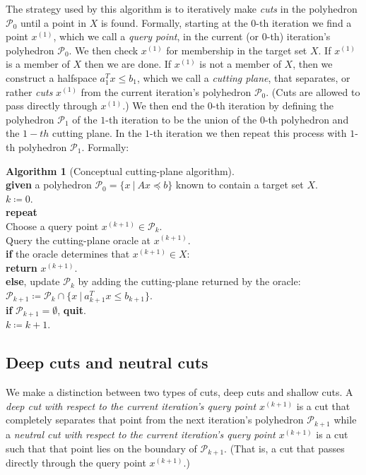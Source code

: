 \documentclass[11pt]{amsart}
\theoremstyle{definition}
\newtheorem{algorithm}{Algorithm}
\theoremstyle{remark}
\newcommand{\ind}{\hspace*{0.5cm}}
\newcommand{\transpose}{T}
\begin{document}
        The strategy used by this algorithm is to iteratively make \emph{cuts} in the polyhedron $\mathcal{P}_0$ until a point in $X$ is found. Formally, starting at the $0$-th iteration we find a point $x^{(1)}$, which we call a \emph{query point}, in the current (or $0$-th) iteration's polyhedron $\mathcal{P}_0$. We then check $x^{(1)}$ for membership in the target set $X$. If $x^{(1)}$ is a member of $X$ then we are done. If $x^{(1)}$ is not a member of $X$, then we construct a halfspace $a_{1}^\transpose x \leq b_{1}$, which we call a \emph{cutting plane}, that separates, or rather \emph{cuts} $x^{(1)}$ from the current iteration's polyhedron $\mathcal{P}_0$. (Cuts are allowed to pass directly through $x^{(1)}$.) We then end the $0$-th iteration by defining the polyhedron $\mathcal{P}_1$ of the $1$-th iteration to be the union of the $0$-th polyhedron and the $1-th$ cutting plane. In the $1$-th iteration we then repeat this process with $1$-th polyhedron $\mathcal{P}_1$. Formally:
        \begin{algorithm}[Conceptual cutting-plane algorithm]
        \label{a:general_cp_alg}\mbox{}\\
            \ind \textbf{given} a polyhedron $\mathcal{P}_0 = \{x \:|\: Ax \preceq b\}$ known to contain a target set $X$. \\
            \ind $k \coloneqq 0$. \\
            \ind \textbf{repeat} \\
            \ind\ind Choose a query point $x^{(k+1)} \in \mathcal{P}_k$. \\
            \ind\ind Query the cutting-plane oracle at $x^{(k+1)}$. \\
            \ind\ind \textbf{if} the oracle determines that $x^{(k+1)} \in X$: \\
            \ind\ind\ind\textbf{return} $x^{(k+1)}$. \\
            \ind\ind \textbf{else}, update $\mathcal{P}_k$ by adding the cutting-plane returned by the oracle: \\ 
            \ind\ind\ind $\mathcal{P}_{k+1} \coloneqq \mathcal{P}_k \cap \{x \:|\: a_{k+1}^\transpose x \leq b_{k+1} \}$. \\
            \ind\ind \textbf{if} $\mathcal{P}_{k+1} = \emptyset$, \textbf{quit}. \\
            \ind\ind $k \coloneqq k+1$.
        \end{algorithm}

    \subsection{Deep cuts and neutral cuts}
        We make a distinction between two types of cuts, deep cuts and shallow cuts. A \emph{deep cut with respect to the current iteration's query point $x^{(k+1)}$} is a cut that completely separates that point from the next iteration's polyhedron $\mathcal{P}_{k+1}$ while a \emph{neutral cut with respect to the current iteration's query point $x^{(k+1)}$} is a cut such that that point lies on the boundary of $\mathcal{P}_{k+1}$. (That is, a cut that passes directly through the query point $x^{(k+1)}$.)
\end{document}
